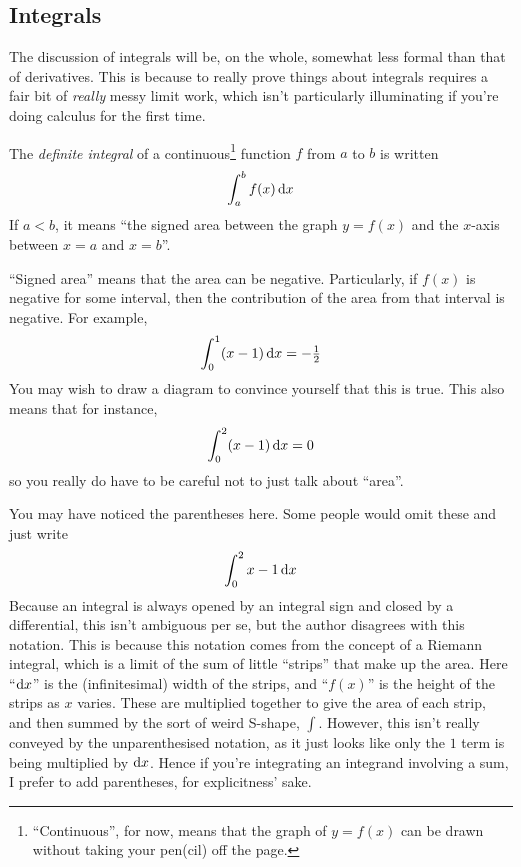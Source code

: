\subsection{Integrals}

The discussion of integrals will be, on the whole, somewhat less formal than
that of derivatives. This is because to really prove things about integrals
requires a fair bit of \emph{really} messy limit work, which isn't particularly
illuminating if you're doing calculus for the first time.

The \emph{definite integral} of a continuous\footnote{
 ``Continuous'', for now, means that the graph of \(y = f(x)\) can be drawn
 without taking your pen(cil) off the page.
} function \(f\) from \(a\) to \(b\)
is written
\begin{equation*}
 \integ[a]<b>{f(x)}{x}
\end{equation*}
If \(a < b\), it means ``the signed area between the graph \(y = f(x)\) and the
\(x\)-axis between \(x = a\) and \(x = b\)''.

``Signed area'' means that the area can be negative. Particularly, if \(f(x)\)
is negative for some interval, then the contribution of the area from that
interval is negative. For example,
\begin{equation*}
 \integ[0]<1>{(x - 1)}{x} = -\tfrac 12
\end{equation*}
You may wish to draw a diagram to convince yourself that this is true. This also
means that for instance,
\begin{equation*}
 \integ[0]<2>{(x - 1)}{x} = 0
\end{equation*}
so you really do have to be careful not to just talk about ``area''.

You may have noticed the parentheses here. Some people would omit these and just
write
\begin{equation*}
 \integ[0]<2>{x - 1}{x}
\end{equation*}
Because an integral is always opened by an integral sign and closed by a
differential, this isn't ambiguous per se, but the author disagrees with this
notation. This is because this notation comes from the concept of a Riemann
integral, which is a limit of the sum of little ``strips'' that make up the
area. Here ``\(\mathrm d x\)'' is the (infinitesimal) width of the strips, and
``\(f(x)\)'' is the height of the strips as \(x\) varies. These are multiplied
together to give the area of each strip, and then summed by the sort of weird
S-shape, \(\int\). However, this isn't really conveyed by the unparenthesised
notation, as it just looks like only the \(1\) term is being multiplied by
\(\mathrm d x\). Hence if you're integrating an integrand involving a sum, I prefer
to add parentheses, for explicitness' sake.

